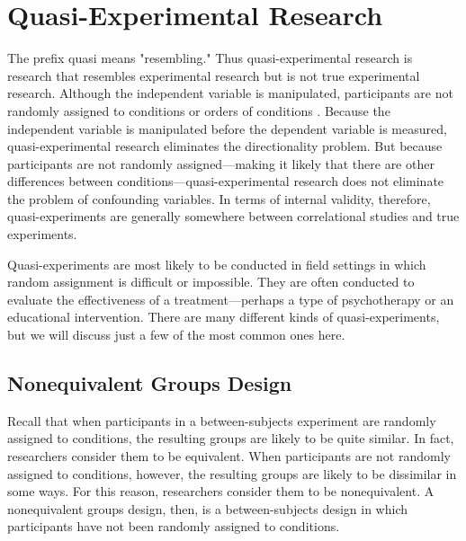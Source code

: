 \newpage
\section{Quasi-Experimental Research}


The prefix quasi means "resembling." Thus quasi-experimental research is research that resembles experimental research but is not true experimental research. Although the independent variable is manipulated, participants are not randomly assigned to conditions or orders of conditions \citep{cook_quasi-experimentation:_1979}. Because the independent variable is manipulated before the dependent variable is measured, quasi-experimental research eliminates the directionality problem. But because participants are not randomly assigned---making it likely that there are other differences between conditions---quasi-experimental research does not eliminate the problem of confounding variables. In terms of internal validity, therefore, quasi-experiments are generally somewhere between correlational studies and true experiments.

Quasi-experiments are most likely to be conducted in field settings in which random assignment is difficult or impossible. They are often conducted to evaluate the effectiveness of a treatment---perhaps a type of psychotherapy or an educational intervention. There are many different kinds of quasi-experiments, but we will discuss just a few of the most common ones here.

\subsection{Nonequivalent Groups Design}

Recall that when participants in a between-subjects experiment are randomly assigned to conditions, the resulting groups are likely to be quite similar. In fact, researchers consider them to be equivalent. When participants are not randomly assigned to conditions, however, the resulting groups are likely to be dissimilar in some ways. For this reason, researchers consider them to be nonequivalent. A nonequivalent groups design, then, is a between-subjects design in which participants have not been randomly assigned to conditions.

